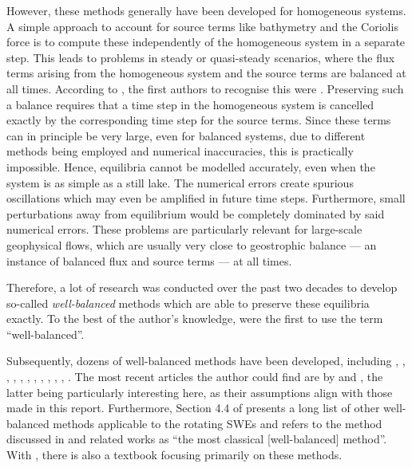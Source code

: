 However, these methods generally have been developed for homogeneous systems. A simple approach to account for source terms like bathymetry and the Coriolis force is to compute these independently of the homogeneous system in a separate step. This leads to problems in steady or quasi-steady scenarios, where the flux terms arising from the homogeneous system and the source terms are balanced at all times. According to \citet{toro2007godunov}, the first authors to recognise this were \citet{glimm1984generalized}. Preserving such a balance requires that a time step in the homogeneous system is  cancelled exactly by the corresponding time step for the source terms. Since these terms can in principle be very large, even for balanced systems, due to different methods being employed and numerical inaccuracies, this is practically impossible. Hence, equilibria cannot be modelled accurately, even when the system is as simple as a still lake. The numerical errors create spurious oscillations which may even be amplified in future time steps. Furthermore, small perturbations away from equilibrium would be completely dominated by said numerical errors. These problems are particularly relevant for large-scale geophysical flows, which are usually very close to geostrophic balance --- an instance of balanced flux and source terms --- at all times.

Therefore, a lot of research was conducted over the past two decades to develop so-called \emph{well-balanced} methods which are able to preserve these equilibria exactly. To the best of the author's knowledge, \citet{greenberg1996well} were the first to use the term ``well-balanced''.

Subsequently, dozens of well-balanced methods have been developed, including \citet{leveque1998balancing}, \citet{garcia2000numerical}, \citet{hubbard2000flux}, \citet{burguete2001efficient}, \citet{gascon2001construction}, \citet{rogers2001adaptive}, \citet{bale2003wave}, \citet{rogers2003mathematical}, \citet{audusse2004fast}, \citet{chinnayya2004well}, \citet{liang2009adaptive}, \citet{liang2009numerical}. The most recent articles the author could find are by \citet{zhang2014well} and \citet{chertockwell}, the latter being particularly interesting here, as their assumptions align with those made in this report. Furthermore, Section 4.4 of \citet{zeitlin2007nonlinear} presents a long list of other well-balanced methods applicable to the rotating SWEs and refers to the method discussed in \citet{audusse2004fast} and related works as ``the most classical [well-balanced] method''. With \citet{bouchut2004nonlinear}, there is also a textbook focusing primarily on these methods.


